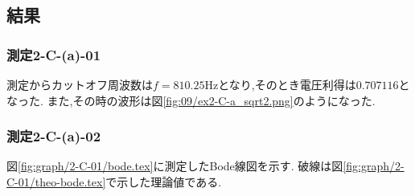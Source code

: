 \subsection{結果}
\subsubsection{測定2-C-(a)-01}
測定からカットオフ周波数は$f=810.25\si{\hertz}$となり,そのとき電圧利得は$0.707116$となった.
また,その時の波形は図\ref{fig:09/ex2-C-a_sqrt2.png}のようになった.
\subsubsection{測定2-C-(a)-02}
図\ref{fig:graph/2-C-01/bode.tex}に測定したBode線図を示す.
破線は図\ref{fig:graph/2-C-01/theo-bode.tex}で示した理論値である.
